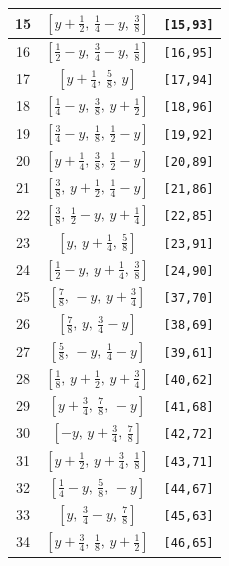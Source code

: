 \documentclass[fleqn,8pt]{jsarticle}
\begin{document}
\begin{longtable}{ccc}
15 & $\left[ y + \frac{1}{2},\, \frac{1}{4} - y,\, \frac{3}{8} \right]$ & {\tt [15,93]} \\ \hline
16 & $\left[ \frac{1}{2} - y,\, \frac{3}{4} - y,\, \frac{1}{8} \right]$ & {\tt [16,95]} \\ \hline
17 & $\left[ y + \frac{1}{4},\, \frac{5}{8},\, y \right]$ & {\tt [17,94]} \\ \hline
18 & $\left[ \frac{1}{4} - y,\, \frac{3}{8},\, y + \frac{1}{2} \right]$ & {\tt [18,96]} \\ \hline
19 & $\left[ \frac{3}{4} - y,\, \frac{1}{8},\, \frac{1}{2} - y \right]$ & {\tt [19,92]} \\ \hline
20 & $\left[ y + \frac{1}{4},\, \frac{3}{8},\, \frac{1}{2} - y \right]$ & {\tt [20,89]} \\ \hline
21 & $\left[ \frac{3}{8},\, y + \frac{1}{2},\, \frac{1}{4} - y \right]$ & {\tt [21,86]} \\ \hline
22 & $\left[ \frac{3}{8},\, \frac{1}{2} - y,\, y + \frac{1}{4} \right]$ & {\tt [22,85]} \\ \hline
23 & $\left[ y,\, y + \frac{1}{4},\, \frac{5}{8} \right]$ & {\tt [23,91]} \\ \hline
24 & $\left[ \frac{1}{2} - y,\, y + \frac{1}{4},\, \frac{3}{8} \right]$ & {\tt [24,90]} \\ \hline
25 & $\left[ \frac{7}{8},\, - y,\, y + \frac{3}{4} \right]$ & {\tt [37,70]} \\ \hline
26 & $\left[ \frac{7}{8},\, y,\, \frac{3}{4} - y \right]$ & {\tt [38,69]} \\ \hline
27 & $\left[ \frac{5}{8},\, - y,\, \frac{1}{4} - y \right]$ & {\tt [39,61]} \\ \hline
28 & $\left[ \frac{1}{8},\, y + \frac{1}{2},\, y + \frac{3}{4} \right]$ & {\tt [40,62]} \\ \hline
29 & $\left[ y + \frac{3}{4},\, \frac{7}{8},\, - y \right]$ & {\tt [41,68]} \\ \hline
30 & $\left[ - y,\, y + \frac{3}{4},\, \frac{7}{8} \right]$ & {\tt [42,72]} \\ \hline
31 & $\left[ y + \frac{1}{2},\, y + \frac{3}{4},\, \frac{1}{8} \right]$ & {\tt [43,71]} \\ \hline
32 & $\left[ \frac{1}{4} - y,\, \frac{5}{8},\, - y \right]$ & {\tt [44,67]} \\ \hline
33 & $\left[ y,\, \frac{3}{4} - y,\, \frac{7}{8} \right]$ & {\tt [45,63]} \\ \hline
34 & $\left[ y + \frac{3}{4},\, \frac{1}{8},\, y + \frac{1}{2} \right]$ & {\tt [46,65]} \\ \hline

\end{longtable}
\end{document}
